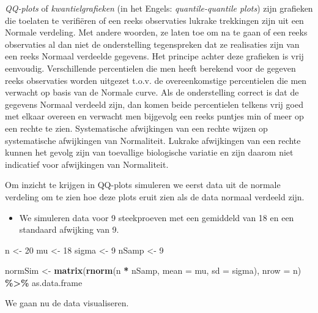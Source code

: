 \documentclass[
  12pt,dutch,coursenotes]{book}
\newenvironment{Shaded}{\begin{snugshade}}{\end{snugshade}}
\newcommand{\DataTypeTok}[1]{\textcolor[rgb]{0.13,0.29,0.53}{#1}}
\newcommand{\DecValTok}[1]{\textcolor[rgb]{0.00,0.00,0.81}{#1}}
\newcommand{\KeywordTok}[1]{\textcolor[rgb]{0.13,0.29,0.53}{\textbf{#1}}}
\newcommand{\NormalTok}[1]{#1}
\newcommand{\OperatorTok}[1]{\textcolor[rgb]{0.81,0.36,0.00}{\textbf{#1}}}
\newcommand{\StringTok}[1]{\textcolor[rgb]{0.31,0.60,0.02}{#1}}
\providecommand{\tightlist}{%
  \setlength{\itemsep}{0pt}\setlength{\parskip}{0pt}}
\theoremstyle{definition}
\theoremstyle{definition}
\theoremstyle{definition}
\theoremstyle{remark}
\begin{document}
\emph{QQ-plots} of \emph{kwantielgrafieken} (in het Engels: \emph{quantile-quantile plots}) zijn grafieken die toelaten te verifiëren of een
reeks observaties lukrake trekkingen zijn uit een Normale verdeling. Met
andere woorden, ze laten toe om na te gaan of een reeks observaties al dan
niet de onderstelling tegenspreken dat ze realisaties zijn van een reeks
Normaal verdeelde gegevens. Het principe achter deze grafieken is vrij
eenvoudig. Verschillende percentielen die men heeft berekend voor de gegeven
reeks observaties worden uitgezet t.o.v. de overeenkomstige percentielen die
men verwacht op basis van de Normale curve. Als de onderstelling correct is
dat de gegevens Normaal verdeeld zijn, dan komen beide percentielen telkens
vrij goed met elkaar overeen en verwacht men bijgevolg een reeks puntjes min
of meer op een rechte te zien.
Systematische afwijkingen van een rechte wijzen op systematische afwijkingen
van Normaliteit. Lukrake afwijkingen van een rechte kunnen het gevolg zijn
van toevallige biologische variatie en zijn daarom niet indicatief voor afwijkingen van
Normaliteit.

Om inzicht te krijgen in QQ-plots simuleren we eerst data uit de normale verdeling om te zien hoe deze plots eruit zien als de data normaal verdeeld zijn.

\begin{itemize}
\tightlist
\item
  We simuleren data voor 9 steekproeven met een gemiddeld van 18 en een standaard afwijking van 9.
\end{itemize}

\begin{Shaded}
\begin{Highlighting}[]
\NormalTok{n \textless{}{-}}\StringTok{ }\DecValTok{20}
\NormalTok{mu \textless{}{-}}\StringTok{ }\DecValTok{18}
\NormalTok{sigma \textless{}{-}}\StringTok{ }\DecValTok{9}
\NormalTok{nSamp \textless{}{-}}\StringTok{ }\DecValTok{9}

\NormalTok{normSim \textless{}{-}}\StringTok{ }\KeywordTok{matrix}\NormalTok{(}\KeywordTok{rnorm}\NormalTok{(n }\OperatorTok{*}\StringTok{ }\NormalTok{nSamp, }\DataTypeTok{mean =}\NormalTok{ mu, }\DataTypeTok{sd =}\NormalTok{ sigma), }
    \DataTypeTok{nrow =}\NormalTok{ n) }\OperatorTok{\%\textgreater{}\%}\StringTok{ }\NormalTok{as.data.frame}
\end{Highlighting}
\end{Shaded}

We gaan nu de data visualiseren.
\end{document}
